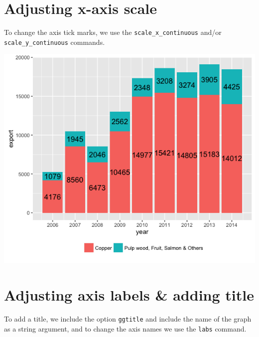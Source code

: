 \section{Adjusting x-axis scale}\label{adjusting-x-axis-scale-2}

To change the axis tick marks, we use the \texttt{scale\_x\_continuous}
and/or \texttt{scale\_y\_continuous} commands.

\begin{Shaded}
\begin{Highlighting}[]
\StringTok{ }\StringTok{ }\NormalTok{(}\NormalTok{(}\NormalTok{,}\NormalTok{,}\NormalTok{))}
\end{Highlighting}
\end{Shaded}

\begin{center}\includegraphics[width=0.55\linewidth]{0_all_posts_pdf/bar_6-1} \end{center}

\section{Adjusting axis labels \& adding
title}\label{adjusting-axis-labels-adding-title-2}

To add a title, we include the option \texttt{ggtitle} and include the
name of the graph as a string argument, and to change the axis names we
use the \texttt{labs} command.

\begin{Shaded}
\begin{Highlighting}[]
\StringTok{ }\StringTok{ }\NormalTok{(}\NormalTok{) +}\StringTok{ }
\StringTok{      }\NormalTok{(}\NormalTok{, }\NormalTok{) }
\end{Highlighting}
\end{Shaded}

